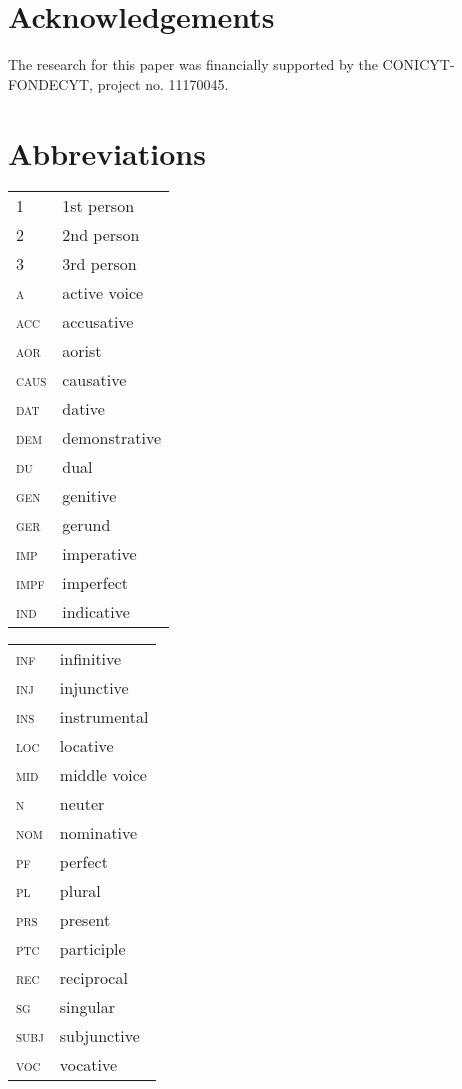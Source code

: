 \documentclass[output=paper]{langscibook}
\begin{document}
\section*{Acknowledgements}

The research for this paper was financially supported by the CONICYT-FONDECYT, project no. 11170045.


\section*{Abbreviations}

\begin{tabularx}{.45\textwidth}{>{\scshape}lQ}
1 &  1st person\\
2 &  2nd person\\
3 &  3rd person\\
\textsc{a} &  active voice\\
\textsc{acc} &  accusative\\
\textsc{aor} &  aorist\\
\textsc{caus} &  causative\\
\textsc{dat} &  dative\\
\textsc{dem} &  demonstrative\\
\textsc{du} &  dual\\
\textsc{gen} &  genitive\\
\textsc{ger} &  gerund\\
\textsc{imp} &  imperative\\
\textsc{impf} &  imperfect\\
\textsc{ind} &  indicative\\
\end{tabularx}
\begin{tabularx}{.45\textwidth}{>{\scshape}lQ}
\textsc{inf} &  infinitive\\
\textsc{inj} &  injunctive\\
\textsc{ins} &  instrumental\\
\textsc{loc} &  locative\\
\textsc{mid} &  middle voice\\
\textsc{n} &  neuter\\
\textsc{nom} &   nominative\\
\textsc{pf} &  perfect\\
\textsc{pl} &  plural\\
\textsc{prs} &  present\\
\textsc{ptc} &  participle\\
\textsc{rec} &  reciprocal\\
\textsc{sg} &  singular\\
\textsc{subj} &  subjunctive\\
\textsc{voc} &  vocative\\
\end{tabularx}


\sloppy\printbibliography[heading=subbibliography,notkeyword=this]
\end{document}
